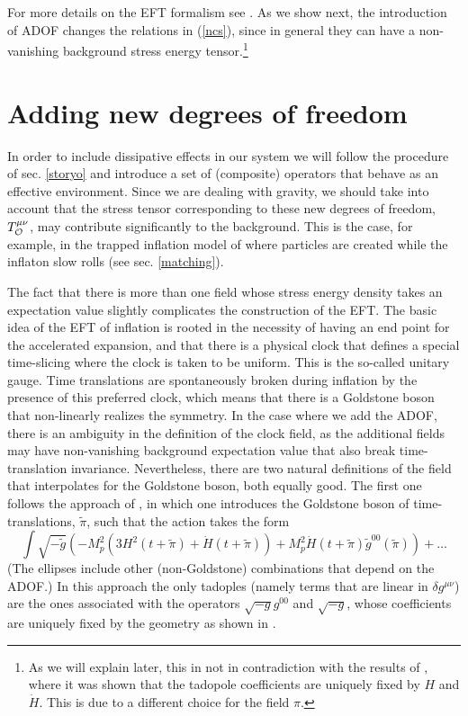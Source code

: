 \documentclass[11pt,amsmath,floats,floatfix,nofootinbib,secnumarabic, superscriptaddress, tightenlines]{revtex4}
\newcommand{\beq}{\begin{equation}}
\newcommand{\eeq}{\end{equation}}
\newcommand{\calo}{{\cal O}}
\begin{document}
{For more details on the EFT formalism see \cite{Creminelli:2006xe, eft1, multieft}. As we show next, the introduction of ADOF changes the relations in (\ref{ncs}), since in general they can have a non-vanishing background stress energy tensor.\footnote{As we will explain later, this in not in contradiction with the results of \cite{eft1}, where it was shown that the tadopole coefficients are uniquely fixed by $H$ and $\dot H$. This is due to a different choice for the field $\pi$.}



\section{Adding new degrees of freedom}\label{newdof}

In order to include dissipative effects in our system we will follow the procedure of sec. \ref{storyo} and introduce a set of (composite) operators that behave as an effective environment. Since we are dealing with gravity, we should take into account that the stress tensor corresponding to these new degrees of freedom, $T^{\mu\nu}_\calo$, may contribute significantly to the background. This is the case, for example, in the trapped inflation model of \cite{trapped} where particles are created while the inflaton slow rolls (see sec. \ref{matching}).

The fact that there is more than one field whose stress energy density takes an expectation value slightly complicates the construction of the  EFT. The basic idea of the EFT of inflation is rooted in the necessity of having an end point for the accelerated expansion, and that there is a physical clock that defines a special time-slicing where the clock is taken to be uniform. This is the so-called unitary gauge. Time translations are spontaneously broken during inflation by the presence of this preferred clock, which means that there is a Goldstone boson that non-linearly realizes the symmetry. In the case where we add the ADOF, there is an ambiguity in the definition of the clock field, as the additional fields may have non-vanishing background expectation value that also break time-translation invariance. Nevertheless, there are two natural definitions of the field that interpolates for the Goldstone boson, both equally good. The first one follows the approach of \cite{multieft}, in which  one introduces the Goldstone boson of time-translations, $\tilde\pi$, such that the action takes the form \cite{eft1,multieft}
\beq
\label{orunit}
\int \sqrt{-\tilde g} \left(-M_p^2(3H^2(t+\tilde\pi)+\dot H(t+\tilde\pi)) +M_p^2\dot H(t+\tilde\pi) \tilde g^{00}(\tilde\pi)\right)+\ldots \eeq 
(The ellipses include other (non-Goldstone) combinations that depend on the ADOF.) In this approach the only tadoples (namely terms that are linear in $\delta g^{\mu\nu}$) are the ones associated with the operators $\sqrt{-g}g^{00}$ and $\sqrt{-g}$, whose coefficients are uniquely fixed by the geometry as shown in \cite{eft1,multieft}.

}
\end{document}
